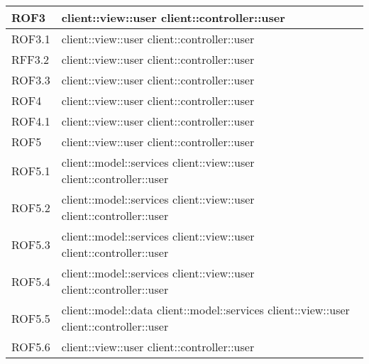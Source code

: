 \begin{center}
\begin{longtable}{| p{4cm} | p{8cm} |}
ROF3   &  client::view::user \newline client::controller::user \\
\hline
ROF3.1   &  client::view::user \newline client::controller::user \\
\hline
RFF3.2   &  client::view::user \newline client::controller::user \\
\hline
ROF3.3   &  client::view::user \newline client::controller::user \\
\hline

ROF4   &  client::view::user \newline client::controller::user \\
\hline
ROF4.1   &  client::view::user \newline client::controller::user \\
\hline

ROF5   &  client::view::user \newline client::controller::user \\
\hline
ROF5.1   &  client::model::services \newline client::view::user \newline client::controller::user \\
\hline
ROF5.2   &  client::model::services \newline client::view::user \newline client::controller::user \\
\hline
ROF5.3   &  client::model::services \newline client::view::user \newline client::controller::user \\
\hline
ROF5.4   &  client::model::services \newline client::view::user \newline client::controller::user \\
\hline
ROF5.5   &  client::model::data \newline client::model::services \newline client::view::user
 \newline client::controller::user \\
\hline
ROF5.6   &  client::view::user
 \newline client::controller::user \\
\hline


\end{longtable}
\end{center}
